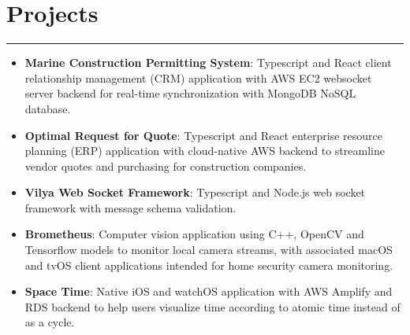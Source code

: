 \documentclass[letterpaper,11pt]{article}
\begin{document}
\section*{Projects}
\vspace{-10px}
\hrule
\vspace{5px}
\begin{itemize}[leftmargin=*,nosep]
  \item \textbf{Marine Construction Permitting System}: Typescript and React client relationship management (CRM) application with AWS EC2 websocket server backend for real-time synchronization with MongoDB NoSQL database.
  \item \textbf{Optimal Request for Quote}: Typescript and React enterprise resource planning (ERP) application with cloud-native AWS backend to streamline vendor quotes and purchasing for construction companies.
  \item \textbf{Vilya Web Socket Framework}: Typescript and Node.js web socket framework with message schema validation.
  \item \textbf{Brometheus}: Computer vision application using C++, OpenCV and Tensorflow models to monitor local camera streams, with associated macOS and tvOS client applications intended for home security camera monitoring.
  \item \textbf{Space Time}: Native iOS and watchOS application with AWS Amplify and RDS backend to help users visualize time according to atomic time instead of as a cycle.
\end{itemize}

\vspace{-10px}
\end{document}
